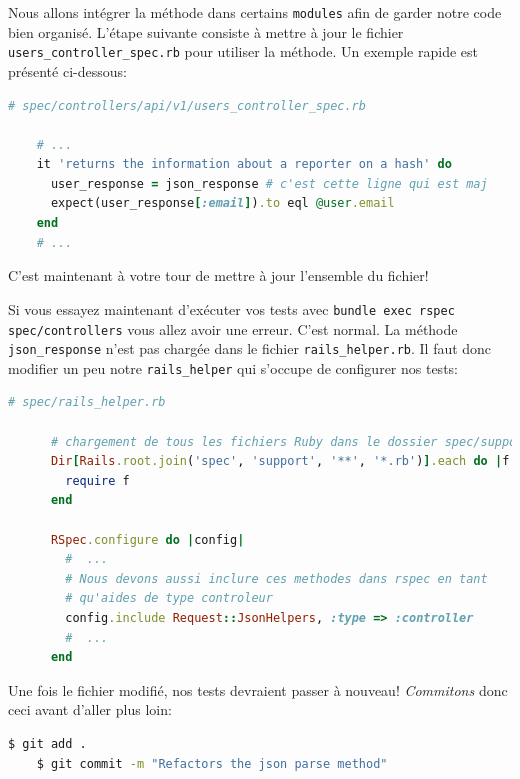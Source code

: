 \documentclass[]{report}
\begin{document}
    Nous allons intégrer la méthode dans certains \verb|modules| afin de garder notre code bien organisé. L'étape suivante consiste à mettre à jour le fichier \verb|users_controller_spec.rb| pour utiliser la méthode. Un exemple rapide est présenté ci-dessous:


    \begin{scriptsize}
    \begin{lstlisting}[language=ruby]
    # spec/controllers/api/v1/users_controller_spec.rb

    # ...
    it 'returns the information about a reporter on a hash' do
      user_response = json_response # c'est cette ligne qui est maj
      expect(user_response[:email]).to eql @user.email
    end
    # ...
    \end{lstlisting}
    \end{scriptsize}

    C'est maintenant à votre tour de mettre à jour l'ensemble du fichier!

    Si vous essayez maintenant d'exécuter vos tests avec \verb|bundle exec rspec spec/controllers| vous allez avoir une erreur. C'est normal. La méthode \verb|json_response| n'est pas chargée dans le fichier \verb|rails_helper.rb|. Il faut donc modifier un peu notre \verb|rails_helper| qui s’occupe de configurer nos tests:

    \begin{scriptsize}
      \begin{lstlisting}[language=ruby, caption={Ajout des méthodes de request\_helpers.rb}]
      # spec/rails_helper.rb

      # chargement de tous les fichiers Ruby dans le dossier spec/support
      Dir[Rails.root.join('spec', 'support', '**', '*.rb')].each do |f|
        require f
      end

      RSpec.configure do |config|
        #  ...
        # Nous devons aussi inclure ces methodes dans rspec en tant
        # qu'aides de type controleur
        config.include Request::JsonHelpers, :type => :controller
        #  ...
      end
      \end{lstlisting}
    \end{scriptsize}

    Une fois le fichier modifié, nos tests devraient passer à nouveau! \textit{Commitons} donc ceci avant d'aller plus loin:

    \begin{scriptsize}
    \begin{lstlisting}[language=bash]
    $ git add .
    $ git commit -m "Refactors the json parse method"
    \end{lstlisting}
    \end{scriptsize}
\end{document}

